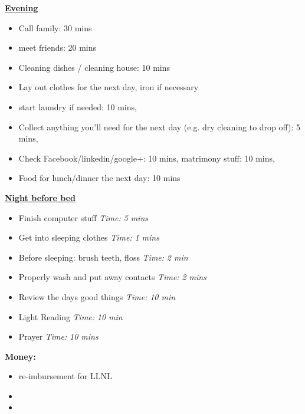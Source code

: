 \documentclass[11pt]{article}
\newcommand{\timeEst}[1]{\textit{Time:} \textit{#1}}
\begin{document}
{  \underline{\textbf{Evening}}
  \begin{itemize}
    \tiny \item \tiny Call family: 30 mins
  \item \tiny meet friends: 20 mins
  \item \tiny Cleaning dishes / cleaning house: 10 mins
  \item \tiny Lay out clothes for the next day, iron if necessary
  \item \tiny start laundry if needed: 10 mins,
  \item \tiny Collect anything you’ll need for the next day (e.g. dry cleaning to drop off): 5 mins,
  \item \tiny Check Facebook/linkedin/google+: 10 mins, matrimony stuff: 10 mins,
  \item \tiny Food for lunch/dinner the next day: 10 mins
  \end{itemize}

  \underline{\textbf{Night before bed}}
  \begin{itemize}
    \tiny \item \tiny Finish computer stuff \timeEst{5 mins}
  \item \tiny Get into sleeping clothes \timeEst{1 mins}
  \item \tiny Before sleeping: brush teeth, floss \timeEst{ 2 min}
  \item \tiny Properly wash and put away contacts \timeEst{ 2 mins}
  \item \tiny Review the days good things \timeEst{ 10 min}
  \item \tiny Light Reading \timeEst{ 10 min}
  \item \tiny Prayer \timeEst{10 mins}
  \end{itemize} 
  \newpage
  
  \textbf{Money:}\\ 
  \begin{itemize} 
    \tiny \item \tiny re-imbursement for LLNL 
  \item \tiny 
  \item \tiny 
  \end{itemize} 

}
\end{document}
